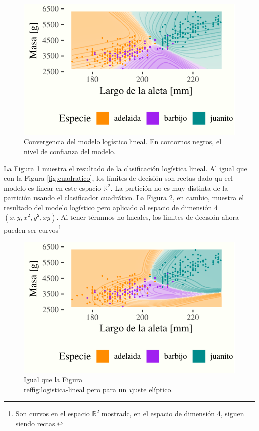 \documentclass[]{tufte-handout}
\begin{document}
\begin{figure}
\includegraphics{TP-Labo-2_files/figure-latex/logistica-lineal-1} \caption[Convergencia del modelo logístico lineal]{Convergencia del modelo logístico lineal. En contornos negros, el nivel de confianza del modelo.}\label{fig:logistica-lineal}
\end{figure}

La Figura \ref{fig:logistica-lineal} muestra el resultado de la clasificación logística lineal. Al igual que con la Figura \ref{fig:cuadratico}, los límites de decisión son rectas dado qu eel modelo es linear en este espacio \(\mathbb{R}^2\). La partición no es muy distinta de la partición usando el clasificador cuadrático. La Figura \ref{fig:logistica-eliptica}, en cambio, muestra el resultado del modelo logístico pero aplicado al espacio de dimensión 4 \((x, y, x^2, y^2, xy)\). Al tener términos no lineales, los límites de decisión ahora pueden ser curvos\footnote{Son curvos en el espacio \(\mathbb{R}^2\) mostrado, en el espacio de dimensión 4, siguen siendo rectas.}

\begin{figure}
\includegraphics{TP-Labo-2_files/figure-latex/logistica-eliptica-1} \caption[Igual que la Figura \\ref{fig:logistica-lineal} pero para un ajuste elíptico]{Igual que la Figura \\ref{fig:logistica-lineal} pero para un ajuste elíptico.}\label{fig:logistica-eliptica}
\end{figure}
\end{document}
